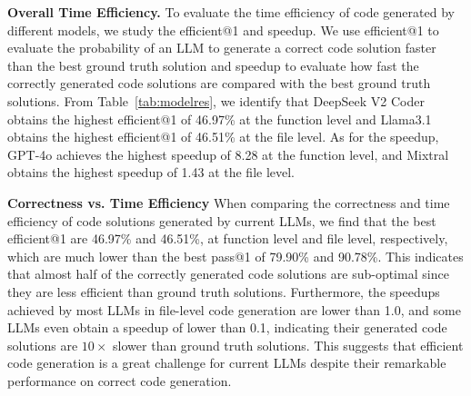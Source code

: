 

\textbf{Overall Time Efficiency.} 
To evaluate the time efficiency of code generated by different models, we study the efficient@1 and speedup. We use efficient@1 to evaluate the probability of an LLM to generate a correct code solution faster than the best ground truth solution and speedup to evaluate how fast the correctly generated code solutions are compared with the best ground truth solutions. From Table~\ref{tab:modelres}, we identify that DeepSeek V2 Coder obtains the highest efficient@1 of 46.97\% at the function level and Llama3.1 obtains the highest efficient@1 of 46.51\% at the file level. As for the speedup, GPT-4o achieves the highest speedup of 8.28 at the function level, and Mixtral obtains the highest speedup of 1.43 at the file level.


\textbf{Correctness vs. Time Efficiency}
When comparing the correctness and time efficiency of code solutions generated by current LLMs, we find that the best efficient@1 are 46.97\% and 46.51\%, at function level and file level, respectively, which are much lower than the best pass@1 of 79.90\% and 90.78\%. This indicates that almost half of the correctly generated code solutions are sub-optimal since they are less efficient than ground truth solutions. Furthermore, the speedups achieved by most LLMs in file-level code generation are lower than 1.0, and some LLMs even obtain a speedup of lower than 0.1, indicating their generated code solutions are $10\times$ slower than ground truth solutions. This suggests that efficient code generation is a great challenge for current LLMs despite their remarkable performance on correct code generation.


